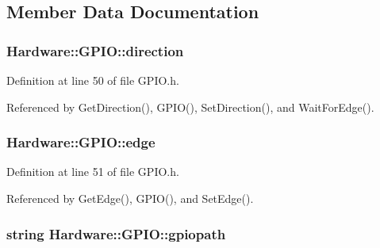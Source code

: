 \subsection{Member Data Documentation}
\hypertarget{class_hardware_1_1_g_p_i_o_a77e93e4f6650507fdc4898d272d540e7}{}
\subsubsection[{direction}]{ Hardware\+::\+G\+P\+I\+O\+::direction\hspace{0.3cm}{\ttfamily [private]}}\label{class_hardware_1_1_g_p_i_o_a77e93e4f6650507fdc4898d272d540e7}


Definition at line 50 of file G\+P\+I\+O.\+h.



Referenced by Get\+Direction(), G\+P\+I\+O(), Set\+Direction(), and Wait\+For\+Edge().

\hypertarget{class_hardware_1_1_g_p_i_o_adf15f74f053069029e99934e28c109e0}{}
\subsubsection[{edge}]{ Hardware\+::\+G\+P\+I\+O\+::edge\hspace{0.3cm}{\ttfamily [private]}}\label{class_hardware_1_1_g_p_i_o_adf15f74f053069029e99934e28c109e0}


Definition at line 51 of file G\+P\+I\+O.\+h.



Referenced by Get\+Edge(), G\+P\+I\+O(), and Set\+Edge().

\hypertarget{class_hardware_1_1_g_p_i_o_ac47062ed6aba52b9e8506e1575bf5061}{}
\subsubsection[{gpiopath}]{\setlength{\rightskip}{0pt plus 5cm}string Hardware\+::\+G\+P\+I\+O\+::gpiopath\hspace{0.3cm}{\ttfamily [private]}}\label{class_hardware_1_1_g_p_i_o_ac47062ed6aba52b9e8506e1575bf5061}


